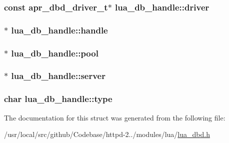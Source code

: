 \subsubsection[{\texorpdfstring{driver}{driver}}]{\setlength{\rightskip}{0pt plus 5cm}const {\bf apr\+\_\+dbd\+\_\+driver\+\_\+t}$\ast$ lua\+\_\+db\+\_\+handle\+::driver}\hypertarget{structlua__db__handle_a41a6a7301da29e09088888b8922d4edc}{}\label{structlua__db__handle_a41a6a7301da29e09088888b8922d4edc}
\subsubsection[{\texorpdfstring{handle}{handle}}]{$\ast$ lua\+\_\+db\+\_\+handle\+::handle}\hypertarget{structlua__db__handle_a947c85f9e009b088d612137192fd81c6}{}\label{structlua__db__handle_a947c85f9e009b088d612137192fd81c6}
\subsubsection[{\texorpdfstring{pool}{pool}}]{$\ast$ lua\+\_\+db\+\_\+handle\+::pool}\hypertarget{structlua__db__handle_a38b83f2e0af4f078f138f71d2f61001f}{}\label{structlua__db__handle_a38b83f2e0af4f078f138f71d2f61001f}
\subsubsection[{\texorpdfstring{server}{server}}]{$\ast$ lua\+\_\+db\+\_\+handle\+::server}\hypertarget{structlua__db__handle_a2ecfc8b18f0f4f5dbb37c42bc1d505fd}{}\label{structlua__db__handle_a2ecfc8b18f0f4f5dbb37c42bc1d505fd}
\subsubsection[{\texorpdfstring{type}{type}}]{\setlength{\rightskip}{0pt plus 5cm}char lua\+\_\+db\+\_\+handle\+::type}\hypertarget{structlua__db__handle_ac281c2727713e84a8632568f6112cd02}{}\label{structlua__db__handle_ac281c2727713e84a8632568f6112cd02}


The documentation for this struct was generated from the following file\+:\begin{DoxyCompactItemize}
\item 
/usr/local/src/github/\+Codebase/httpd-\/2../modules/lua/\hyperlink{lua__dbd_8h}{lua\+\_\+dbd.\+h}\end{DoxyCompactItemize}
